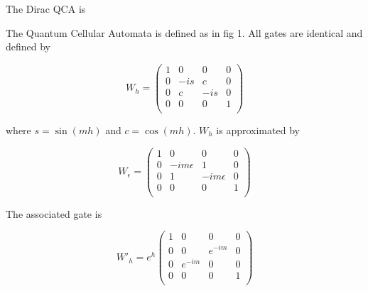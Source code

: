 \documentclass{article}
\newcommand{\e}{\epsilon}
\begin{document}
The Dirac QCA is

The Quantum Cellular Automata is defined as in fig 1. All gates are identical and defined by

\begin{equation}
W_h = \begin{pmatrix}
1 & 0 & 0 & 0\\
0 & -is & c & 0\\
0 & c & -is & 0\\
0 & 0 & 0 & 1\\
\end{pmatrix}
\end{equation}

where $s = \sin(mh)$ and $c = \cos(mh)$. $W_h$ is approximated by

\begin{equation}
W_\e = \begin{pmatrix}
1 & 0 & 0 & 0\\
0 & -im\e & 1 & 0\\
0 & 1 & -im\e & 0\\
0 & 0 & 0 & 1\\
\end{pmatrix}
\end{equation}

The associated gate is

\begin{equation}
W'_h = e^h \begin{pmatrix}
1 & 0 & 0 & 0\\
0 & 0 & e^{-im} & 0\\
0 & e^{-im} & 0 & 0\\
0 & 0 & 0 & 1\\
\end{pmatrix}
\end{equation}


\end{document}
